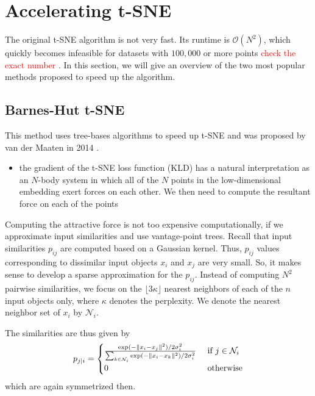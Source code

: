 \section{Accelerating t-SNE}

The original t-SNE algorithm is not very fast. Its runtime is $\mathcal{O}(N^2)$, which quickly becomes infeasible for datasets with $100,000$ or more points \textcolor{red}{check the exact number} . In this section, we will give an overview of the two most popular methods proposed to speed up the algorithm. 

\subsection*{Barnes-Hut t-SNE}
This method uses tree-bases algorithms to speed up t-SNE and was proposed by van der Maaten in 2014 \cite{vdMaa14}. 

\begin{itemize}
    \item the gradient of the t-SNE loss function (KLD) has a natural interpretation as an $N$-body system in which all of the $N$ points in the low-dimensional embedding exert forces on each other. We then need to compute the resultant force on each of the points
\end{itemize}

Computing the attractive force is not too expensive computationally, if we approximate input similarities and use vantage-point trees. Recall that input similarities $p_{ij}$ are computed based on a Gaussian kernel. 
Thus, $p_{ij}$ values corresponding to dissimilar input objects $x_i$ and $x_j$ are very small. 
So, it makes sense to develop a sparse approximation for the $p_{ij}$. Instead of computing $N^2$ pairwise similarities, we focus on the $\lfloor 3 \kappa \rfloor$ nearest neighbors of each of the $n$ input objects only, where $\kappa$ denotes the perplexity. We denote the nearest neighbor set of $x_i$ by $\mathcal{N}_i$. 

The similarities are thus given by 
\begin{equation}
    p_{j|i} = \begin{cases}
    \frac{\exp(-\lVert x_i - x_j\rVert^2) / 2 \sigma_i^2}{\sum_{k \in \mathcal{N}_i} \exp(-\lVert x_i - x_k\rVert^2) / 2 \sigma_i^2} & \text{ if } j \in \mathcal{N}_i \\
    0  & \text{ otherwise}
    \end{cases}
\end{equation}
which are again symmetrized then. 

